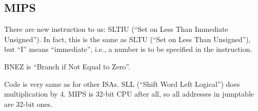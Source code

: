 \ifx\RUSSIAN\undefined
\subsection{MIPS}



There are new instruction to us: SLTIU (``Set on Less Than Immediate Unsigned''). 
In fact, this is the same as SLTU (``Set on Less Than Unsigned''), but ``I'' means ``immediate'', i.e., 
a number is to be specified in the instruction.

BNEZ is ``Branch if Not Equal to Zero''.

Code is very same as for other \ac{ISA}s.
SLL (``Shift Word Left Logical'') does multiplication by 4. 
MIPS is 32-bit CPU after all, so all addresses in jumptable are 32-bit ones.

\fi
